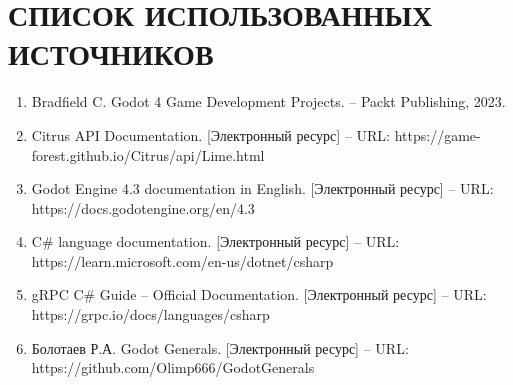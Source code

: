 \section*{СПИСОК ИСПОЛЬЗОВАННЫХ ИСТОЧНИКОВ}
\begin{enumerate}[label=\arabic*)]
    \item Bradfield C. Godot 4 Game Development Projects. -- Packt Publishing, 2023.
    \item Citrus API Documentation. [Электронный ресурс] -- URL: https://game-forest.github.io/Citrus/api/Lime.html
    \item Godot Engine 4.3 documentation in English. [Электронный ресурс] -- URL: https://docs.godotengine.org/en/4.3
    \item C\# language documentation. [Электронный ресурс] -- URL: https://learn.microsoft.com/en-us/dotnet/csharp
    \item gRPC C\# Guide -- Official Documentation. [Электронный ресурс] -- URL: https://grpc.io/docs/languages/csharp
    \item Болотаев Р.А. Godot Generals. [Электронный ресурс] -- URL: https://github.com/Olimp666/GodotGenerals
\end{enumerate}